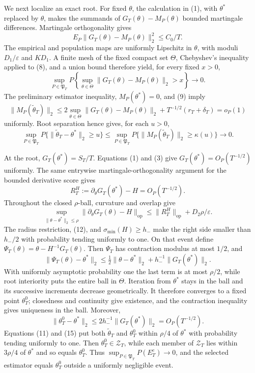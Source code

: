 We next localize an exact root.  For fixed \(\theta\), the calculation in (1), with \(\theta^*\) replaced by \(\theta\), makes the summands of \(G_T(\theta)-M_P(\theta)\) bounded martingale differences.  Martingale orthogonality gives
\[
 E_P\|G_T(\theta)-M_P(\theta)\|_2^2\le C_0/T.
\tag{8}
\]
The empirical and population maps are uniformly Lipschitz in \(\theta\), with moduli \(D_1/\varepsilon\) and \(KD_1\).  A finite mesh of the fixed compact set \(\Theta\), Chebyshev's inequality applied to (8), and a union bound therefore yield, for every fixed \(x>0\),
\[
 \sup_{P\in\mathfrak P_T}P\!\left\{\sup_{\theta\in\Theta}
 \|G_T(\theta)-M_P(\theta)\|_2>x\right\}\longrightarrow0.
\tag{9}
\]
The preliminary estimator inequality, \(M_P(\theta^*)=0\), and (9) imply
\[
 \|M_P(\widetilde\theta_T)\|_2
 \le2\sup_{\theta\in\Theta}\|G_T(\theta)-M_P(\theta)\|_2
 +T^{-1/2}(r_T+\delta_T)=o_P(1)
\tag{10}
\]
uniformly.  Root separation hence gives, for each \(u>0\),
\[
 \sup_{P\in\mathfrak P_T}P\{\|\widetilde\theta_T-\theta^*\|_2\ge u\}
 \le\sup_{P\in\mathfrak P_T}P\{\|M_P(\widetilde\theta_T)\|_2
 \ge\kappa(u)\}\longrightarrow0.
\tag{11}
\]

At the root, \(G_T(\theta^*)=S_T/T\).  Equations (1) and (3) give \(G_T(\theta^*)=O_P(T^{-1/2})\) uniformly.  The same entrywise martingale-orthogonality argument for the bounded derivative score gives
\[
 R_T^H:=\partial_\theta G_T(\theta^*)-H=O_P(T^{-1/2}).
\tag{12}
\]
Throughout the closed \(\rho\)-ball, curvature and overlap give
\[
 \sup_{\|\theta-\theta^*\|_2\le\rho}
 \|\partial_\theta G_T(\theta)-H\|_{\mathrm{op}}
 \le\|R_T^H\|_{\mathrm{op}}+D_2\rho/\varepsilon.
\tag{13}
\]
The radius restriction, (12), and \(\sigma_{\min}(H)\ge h_-\) make the right side smaller than \(h_-/2\) with probability tending uniformly to one.  On that event define \(\Psi_T(\theta)=\theta-H^{-1}G_T(\theta)\).  Then \(\Psi_T\) has contraction modulus at most \(1/2\), and
\[
 \|\Psi_T(\theta)-\theta^*\|_2
 \le\tfrac12\|\theta-\theta^*\|_2+h_-^{-1}\|G_T(\theta^*)\|_2.
\tag{14}
\]
With uniformly asymptotic probability one the last term is at most \(\rho/2\), while root interiority puts the entire ball in \(\Theta\).  Iteration from \(\theta^*\) stays in the ball and its successive increments decrease geometrically.  It therefore converges to a fixed point \(\theta_T^0\); closedness and continuity give existence, and the contraction inequality gives uniqueness in the ball.  Moreover,
\[
 \|\theta_T^0-\theta^*\|_2
 \le2h_-^{-1}\|G_T(\theta^*)\|_2=O_P(T^{-1/2}).
\tag{15}
\]
Equations (11) and (15) put both \(\widetilde\theta_T\) and \(\theta_T^0\) within \(\rho/4\) of \(\theta^*\) with probability tending uniformly to one.  Then \(\theta_T^0\in\mathcal Z_T\), while each member of \(\mathcal Z_T\) lies within \(3\rho/4\) of \(\theta^*\) and so equals \(\theta_T^0\).  Thus \(\sup_{P\in\mathfrak P_T}P(E_T^c)\to0\), and the selected estimator equals \(\theta_T^0\) outside a uniformly negligible event.

